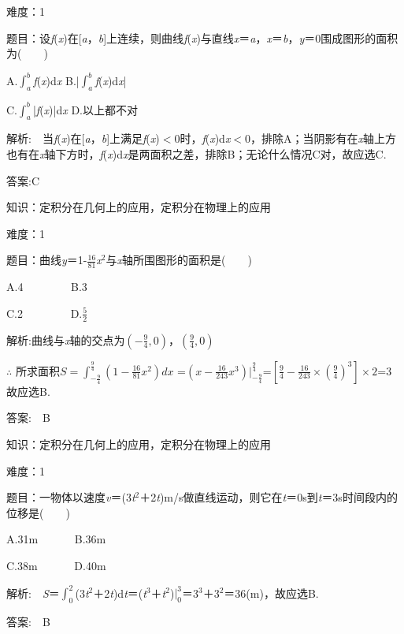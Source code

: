 \documentclass{article} %
\begin{document}
 难度：1

 题目：设\textit{f}(\textit{x})在[\textit{a}，\textit{b}]上连续，则曲线\textit{f}(\textit{x})与直线\textit{x}＝\textit{a}，\textit{x}＝\textit{b}，\textit{y}＝0围成图形的面积为(　　)

A.$\int_a^b$\textit{f}(\textit{x})d\textit{x}       B.|$\int_a^b$\textit{f}(\textit{x})d\textit{x}|

C.$\int_a^b$|\textit{f}(\textit{x})|d\textit{x}       D.以上都不对

 解析:　当\textit{f}(\textit{x})在[\textit{a}，\textit{b}]上满足\textit{f}(\textit{x})$\mathrm{<}$0时，\textit{f}(\textit{x})d\textit{x}$\mathrm{<}$0，排除A；当阴影有在\textit{x}轴上方也有在\textit{x}轴下方时，\textit{f}(\textit{x})d\textit{x}是两面积之差，排除B；无论什么情况C对，故应选C.

 答案:C

 

 知识：定积分在几何上的应用，定积分在物理上的应用

 难度：1

 题目：曲线\textit{y}＝1-$\frac{16}{81}$\textit{x}${}^{2}$与\textit{x}轴所围图形的面积是(　　)

A.4　　　　    B.3　　　　

C.2　　　　    D.$\frac{5}{2}$

 解析:曲线与\textit{x}轴的交点为$(-\frac{9}{4},0)$，$(\frac{9}{4},0)$

$\therefore$ 所求面积$S=\int_{-\frac{9}{4}}^{\frac{9}{4}}(1-\frac{16}{81}x^2)dx$
=$(x-\frac{16}{243}x^3)|_{-\frac{9}{4}}^{\frac{9}{4}}$=$[\frac{9}{4}-\frac{16}{243}\times(\frac{9}{4})^3]\times2$=3
故应选B.

 答案:　B





 知识：定积分在几何上的应用，定积分在物理上的应用

 难度：1

 题目：一物体以速度\textit{v}＝(3\textit{t}${}^{2}$＋2\textit{t})m/s做直线运动，则它在\textit{t}＝0s到\textit{t}＝3s时间段内的位移是(　　)

A.31m　　　    B.36m　　　

C.38m　　　    D.40m

 解析:　\textit{S}＝$\int_{0}^{2}$(3\textit{t}${}^{2}$＋2\textit{t})d\textit{t}＝(\textit{t}${}^{3}$＋\textit{t}${}^{2}$)$|_0^3$＝3${}^{3}$＋3${}^{2}$＝36(m)，故应选B.

 答案:　B
\end{document}
